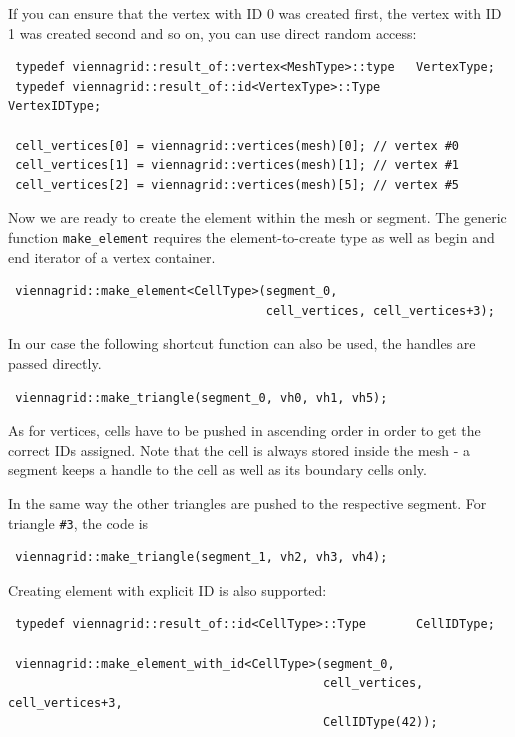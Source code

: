 If you can ensure that the vertex with ID 0 was created first, the vertex with ID 1 was created second and so on, you can use direct random access:
\begin{lstlisting}
 typedef viennagrid::result_of::vertex<MeshType>::type   VertexType;
 typedef viennagrid::result_of::id<VertexType>::Type       VertexIDType;
 
 cell_vertices[0] = viennagrid::vertices(mesh)[0]; // vertex #0
 cell_vertices[1] = viennagrid::vertices(mesh)[1]; // vertex #1
 cell_vertices[2] = viennagrid::vertices(mesh)[5]; // vertex #5
\end{lstlisting}

Now we are ready to create the element within the mesh or segment. The generic function \lstinline|make_element| requires the element-to-create type as well as begin and end iterator of a vertex container.

\begin{lstlisting}
 viennagrid::make_element<CellType>(segment_0,
                                    cell_vertices, cell_vertices+3);
\end{lstlisting}

In our case the following shortcut function can also be used, the handles are passed directly.
\begin{lstlisting}
 viennagrid::make_triangle(segment_0, vh0, vh1, vh5);
\end{lstlisting}

As for vertices, cells have to be pushed in ascending order in order to get the correct IDs assigned. Note that the cell is always stored inside the mesh - a segment keeps a handle to the cell as well as its boundary cells only.

In the same way the other triangles are pushed to the respective segment. For triangle \lstinline|#3|, the code is
\begin{lstlisting}
 viennagrid::make_triangle(segment_1, vh2, vh3, vh4);
\end{lstlisting}

Creating element with explicit ID is also supported:

\begin{lstlisting}
 typedef viennagrid::result_of::id<CellType>::Type       CellIDType;
 
 viennagrid::make_element_with_id<CellType>(segment_0,
                                            cell_vertices, cell_vertices+3,
                                            CellIDType(42));
\end{lstlisting}
